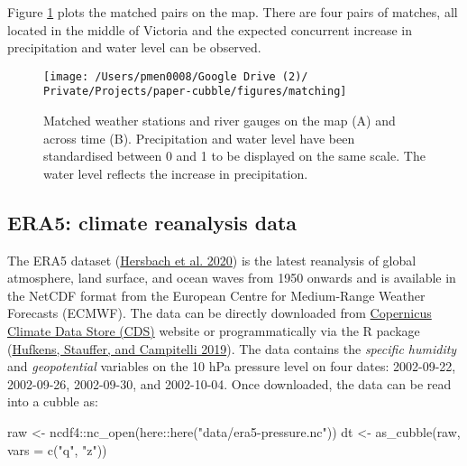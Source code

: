 \documentclass{article}
\newenvironment{Shaded}{\begin{snugshade}}{\end{snugshade}}
\newcommand{\AttributeTok}[1]{\textcolor[rgb]{0.77,0.63,0.00}{#1}}
\newcommand{\FunctionTok}[1]{\textcolor[rgb]{0.00,0.00,0.00}{#1}}
\newcommand{\NormalTok}[1]{#1}
\newcommand{\OtherTok}[1]{\textcolor[rgb]{0.56,0.35,0.01}{#1}}
\newcommand{\SpecialCharTok}[1]{\textcolor[rgb]{0.00,0.00,0.00}{#1}}
\newcommand{\StringTok}[1]{\textcolor[rgb]{0.31,0.60,0.02}{#1}}
\begin{document}
Figure \ref{fig:matching} plots the matched pairs on the map. There are four pairs of matches, all located in the middle of Victoria and the expected concurrent increase in precipitation and water level can be observed.

\begin{figure}
\texttt{[image: /Users/pmen0008/Google Drive (2)/ Private/Projects/paper-cubble/figures/matching]} \caption{Matched weather stations and river gauges on the map (A) and across time (B). Precipitation and water level have been standardised between 0 and 1 to be displayed on the same scale. The water level reflects the increase in precipitation.}\label{fig:matching}
\end{figure}

\hypertarget{era5-climate-reanalysis-data}{%
\subsection{ERA5: climate reanalysis data}\label{era5-climate-reanalysis-data}}

The ERA5 dataset (\protect\hyperlink{ref-hersbach2020era5}{Hersbach et al. 2020}) is the latest reanalysis of global atmosphere, land surface, and ocean waves from 1950 onwards and is available in the NetCDF format from the European Centre for Medium-Range Weather Forecasts (ECMWF). The data can be directly downloaded from \href{https://cds.climate.copernicus.eu/cdsapp\#!/dataset/reanalysis-era5-pressure-levels?tab=overview}{Copernicus Climate Data Store (CDS)} website or programmatically via the R package  (\protect\hyperlink{ref-ecwmfr}{Hufkens, Stauffer, and Campitelli 2019}). The  data contains the \emph{specific humidity} and \emph{geopotential} variables on the 10 hPa pressure level on four dates: 2002-09-22, 2002-09-26, 2002-09-30, and 2002-10-04. Once downloaded, the data can be read into a cubble as:

\begin{Shaded}
\begin{Highlighting}[]
\NormalTok{raw }\OtherTok{\textless{}{-}}\NormalTok{ ncdf4}\SpecialCharTok{::}\FunctionTok{nc\_open}\NormalTok{(here}\SpecialCharTok{::}\FunctionTok{here}\NormalTok{(}\StringTok{"data/era5{-}pressure.nc"}\NormalTok{))}
\NormalTok{dt }\OtherTok{\textless{}{-}} \FunctionTok{as\_cubble}\NormalTok{(raw, }\AttributeTok{vars =} \FunctionTok{c}\NormalTok{(}\StringTok{"q"}\NormalTok{, }\StringTok{"z"}\NormalTok{))}
\end{Highlighting}
\end{Shaded}
\end{document}
